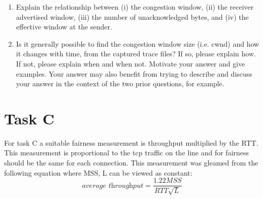\documentclass[10pt]{article}
\begin{document}
\begin{enumerate}
  \item{Explain the relationship between (i) the congestion window, (ii) the
  receiver advertised window, (iii) the number of unacknowledged bytes, and (iv)
  the effective window at the sender.}
  \item{Is it generally
  possible to find the congestion window size (i.e. cwnd) and how it changes with
  time, from the captured trace files? If so, please explain how. If not, please
  explain when and when not. Motivate your answer and give examples. Your answer
  may also benefit from trying to describe and discuss your answer in the context
  of the two prior questions, for example.}
\end{enumerate}

\section{Task C}
For task C a suitable fairness measurement is throughput multiplied by the RTT.
This measurement is proportional to the tcp traffic on the line and for fairness
should be the same for each connection. This measurement was gleamed from the
following equation where MSS, L can be viewed as constant:
\begin{equation}
\textit{average throughput} = \frac{1.22MSS}{RTT\sqrt{L}} 
\end{equation}
\end{document}
